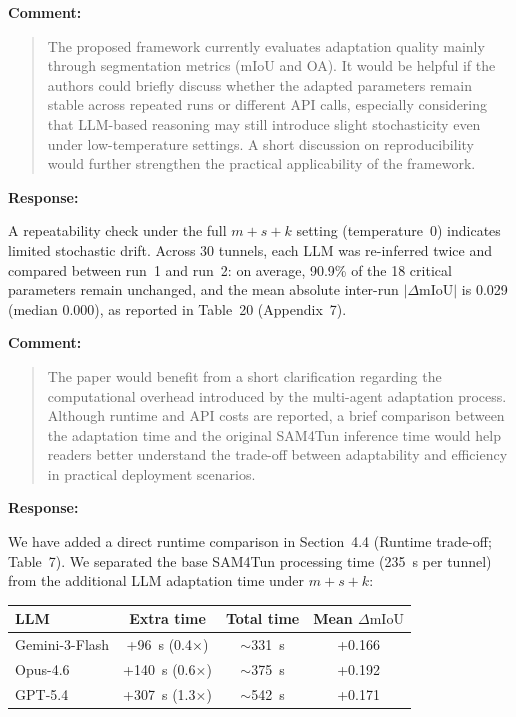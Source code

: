 \documentclass[11pt,a4paper]{article}
\newenvironment{commentblock}{%
  \par\smallskip\noindent\textbf{Comment:}\par
  \begin{quote}\itshape\color{black}
}{%
  \end{quote}\smallskip
}
\newenvironment{responseblock}{%
  \par\smallskip\noindent\textbf{Response:}\par
  \begingroup\color{responsegreen}
}{%
  \endgroup\smallskip
}
\begin{document}
\begin{commentblock}
The proposed framework currently evaluates adaptation quality mainly through segmentation metrics (mIoU and OA). It would be helpful if the authors could briefly discuss whether the adapted parameters remain stable across repeated runs or different API calls, especially considering that LLM-based reasoning may still introduce slight stochasticity even under low-temperature settings. A short discussion on reproducibility would further strengthen the practical applicability of the framework.
\end{commentblock}
\begin{responseblock}
A repeatability check under the full $m+s+k$ setting (temperature~0) indicates limited stochastic drift. Across 30 tunnels, each LLM was re-inferred twice and compared between run~1 and run~2: on average, 90.9\% of the 18 critical parameters remain unchanged, and the mean absolute inter-run $|\Delta\text{mIoU}|$ is 0.029 (median 0.000), as reported in Table~20 (Appendix~7).
\end{responseblock}

\begin{commentblock}
The paper would benefit from a short clarification regarding the computational overhead introduced by the multi-agent adaptation process. Although runtime and API costs are reported, a brief comparison between the adaptation time and the original SAM4Tun inference time would help readers better understand the trade-off between adaptability and efficiency in practical deployment scenarios.
\end{commentblock}
\begin{responseblock}
We have added a direct runtime comparison in Section~4.4 (Runtime trade-off; Table~7). We separated the base SAM4Tun processing time (235~s per tunnel) from the additional LLM adaptation time under $m+s+k$:

{%
\begin{table}[H]
  \centering
  \small
  \color{responsegreen}
  \label{tab:runtime-tradeoff}
  \begin{tabular}{@{}lccc@{}}
    \toprule
    LLM & Extra time & Total time & Mean $\Delta\text{mIoU}$ \\
    \midrule
    Gemini-3-Flash & +96~s (0.4$\times$)  & $\sim$331~s & +0.166 \\
    Opus-4.6       & +140~s (0.6$\times$) & $\sim$375~s & +0.192 \\
    GPT-5.4        & +307~s (1.3$\times$) & $\sim$542~s & +0.171 \\
    \bottomrule
  \end{tabular}
\end{table}
}%
\end{responseblock}
\end{document}
